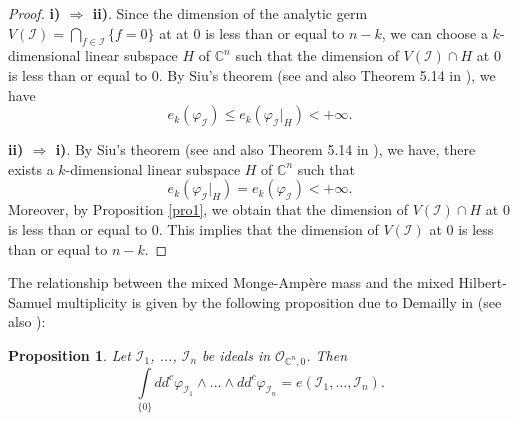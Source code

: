 \documentclass[a4paper,oneside,reqno,11pt]{article}
\newtheorem{proposition}[theorem]{Proposition}
\begin{document}
\begin{proof}
\textbf{i) $\Rightarrow$ ii)}. Since the dimension of the analytic germ $V(\mathcal{I})=\bigcap\limits_{ f\in\mathcal{I} } \{f = 0\}$ at
at $0$ is less than or equal to $n - k$, we can choose a $k$-dimensional linear subspace $H$ of $\mathbb{C}^n$ such that the dimension of $V(\mathcal{I}) \cap H$ at $0$ is less than or equal to $0$. By Siu's theorem (see \cite{Si74} and also Theorem 5.14 in \cite{De92}), we have
$$e_k( \varphi_{ \mathcal{I} } ) \leq e_k(\varphi_{ \mathcal{I} }|_H) < +\infty.$$

\textbf{ii) $\Rightarrow$ i)}. By Siu's theorem (see \cite{Si74} and also Theorem 5.14 in \cite{De92}), we have, there exists a $k$-dimensional linear subspace $H$ of $\mathbb C^n$ such that
$$e_k(\varphi_{ \mathcal{I} }|_H) = e_k(\varphi_{ \mathcal{I} }) < +\infty.$$
Moreover, by Proposition \ref{pro1}, we obtain that the dimension of $V(\mathcal{I}) \cap H$ at $0$ is less than or equal to $0$. This implies that the dimension of $V(\mathcal{I})$ at $0$ is less than or equal to $n - k$.
\end{proof}

The relationship between the mixed Monge-Amp\`{e}re mass and the mixed Hilbert-Samuel multiplicity is given by the following proposition due to Demailly in \cite{De09} (see also \cite{Ki21}):

\begin{proposition}\label{Monge-Ampere_Hilbert_Samuel_1} Let $\mathcal I_1$, ..., $\mathcal I_n$ be ideals in $\mathcal O_{ \mathbb C^n, 0}$. Then
$$\int\limits_{ \{ 0\} } dd^c \varphi_{\mathcal I_1}\wedge ... \wedge dd^c \varphi_{\mathcal I_n} = e (\mathcal I_1, ..., \mathcal I_n).$$
\end{proposition}
\end{document}
